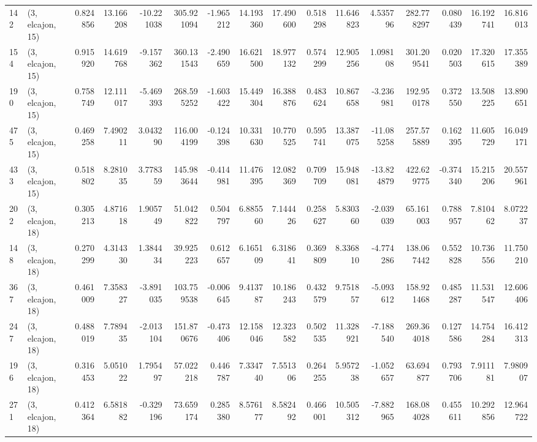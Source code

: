 \begin{tabular}{llrrrrrrrrrrrrrr}
142 &  (3, elcajon, 15) &   0.824856 &  13.166208 & -10.221038 &   305.921094 &  -1.965212 &  14.193360 &  17.490600 &  0.518298 &  11.646823 &   4.535796 &   282.778297 &  0.080439 &  16.192741 &  16.816013 \\
154 &  (3, elcajon, 15) &   0.915920 &  14.619768 &  -9.157362 &   360.131543 &  -2.490659 &  16.621500 &  18.977132 &  0.574299 &  12.905256 &   1.098108 &   301.209541 &  0.020503 &  17.320615 &  17.355389 \\
190 &  (3, elcajon, 15) &   0.758749 &  12.111017 &  -5.469393 &   268.595252 &  -1.603422 &  15.449304 &  16.388876 &  0.483624 &  10.867658 &  -3.236981 &   192.950178 &  0.372550 &  13.508225 &  13.890651 \\
475 &  (3, elcajon, 15) &   0.469258 &   7.490211 &   3.043290 &   116.004199 &  -0.124398 &  10.331630 &  10.770525 &  0.595741 &  13.387075 & -11.085258 &   257.575889 &  0.162395 &  11.605729 &  16.049171 \\
433 &  (3, elcajon, 15) &   0.518802 &   8.281035 &   3.778359 &   145.983644 &  -0.414981 &  11.476395 &  12.082369 &  0.709709 &  15.948081 & -13.824879 &   422.629775 & -0.374340 &  15.215206 &  20.557961 \\
202 &  (3, elcajon, 18) &   0.305213 &   4.871618 &   1.905749 &    51.042822 &   0.504797 &   6.885560 &   7.144426 &  0.258627 &   5.830360 &  -2.039039 &    65.161003 &  0.788957 &   7.810462 &   8.072237 \\
148 &  (3, elcajon, 18) &   0.270299 &   4.314330 &   1.384434 &    39.925223 &   0.612657 &   6.165109 &   6.318641 &  0.369809 &   8.336810 &  -4.774286 &   138.067442 &  0.552828 &  10.736556 &  11.750210 \\
367 &  (3, elcajon, 18) &   0.461009 &   7.358327 &  -3.891035 &   103.759538 &  -0.006645 &   9.413787 &  10.186243 &  0.432579 &   9.751857 &  -5.093612 &   158.921468 &  0.485287 &  11.531547 &  12.606406 \\
247 &  (3, elcajon, 18) &   0.488019 &   7.789435 &  -2.013104 &   151.870676 &  -0.473406 &  12.158046 &  12.323582 &  0.502535 &  11.328921 &  -7.188540 &   269.364018 &  0.127586 &  14.754284 &  16.412313 \\
196 &  (3, elcajon, 18) &   0.316453 &   5.051022 &   1.795497 &    57.022218 &   0.446787 &   7.334740 &   7.551306 &  0.264255 &   5.957238 &  -1.052657 &    63.694877 &  0.793706 &   7.911181 &   7.980907 \\
271 &  (3, elcajon, 18) &   0.412364 &   6.581882 &  -0.329196 &    73.659174 &   0.285380 &   8.576177 &   8.582492 &  0.466001 &  10.505312 &  -7.882965 &   168.084028 &  0.455611 &  10.292856 &  12.964722 \\

\end{tabular}
